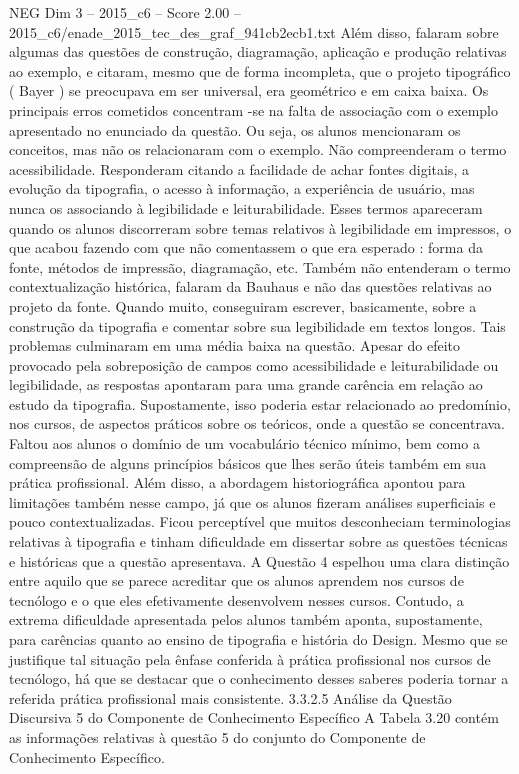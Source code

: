 \begin{textsample}{NEG Dim 3 – 2015\_c6 – Score 2.00 – 2015\_c6/enade\_2015\_tec\_des\_graf\_941cb2ecb1.txt}
Além disso, falaram sobre algumas das questões de construção, diagramação, aplicação e produção relativas ao exemplo, e citaram, mesmo que de forma incompleta, que o projeto tipográfico ( Bayer ) se preocupava em ser universal, era geométrico e em caixa baixa.
Os principais erros cometidos concentram -se na falta de associação com o exemplo apresentado no enunciado da questão.
Ou seja, os alunos mencionaram os conceitos, mas não os relacionaram com o exemplo.
Não compreenderam o termo acessibilidade.
Responderam citando a facilidade de achar fontes digitais, a evolução da tipografia, o acesso à informação, a experiência de usuário, mas nunca os associando à legibilidade e leiturabilidade.
Esses termos apareceram quando os alunos discorreram sobre temas relativos à legibilidade em impressos, o que acabou fazendo com que não comentassem o que era esperado : forma da fonte, métodos de impressão, diagramação, etc.
Também não entenderam o termo contextualização histórica, falaram da Bauhaus e não das questões relativas ao projeto da fonte.
Quando muito, conseguiram escrever, basicamente, sobre a construção da tipografia e comentar sobre sua legibilidade em textos longos.
Tais problemas culminaram em uma média baixa na questão.
Apesar do efeito provocado pela sobreposição de campos como acessibilidade e leiturabilidade ou legibilidade, as respostas apontaram para uma grande carência em relação ao estudo da tipografia.
Supostamente, isso poderia estar relacionado ao predomínio, nos cursos, de aspectos práticos sobre os teóricos, onde a questão se concentrava.
Faltou aos alunos o domínio de um vocabulário técnico mínimo, bem como a compreensão de alguns princípios básicos que lhes serão úteis também em sua prática profissional.
Além disso, a abordagem historiográfica apontou para limitações também nesse campo, já que os alunos fizeram análises superficiais e pouco contextualizadas.
Ficou perceptível que muitos desconheciam terminologias relativas à tipografia e tinham dificuldade em dissertar sobre as questões técnicas e históricas que a questão apresentava.
A Questão 4 espelhou uma clara distinção entre aquilo que se parece acreditar que os alunos aprendem nos cursos de tecnólogo e o que eles efetivamente desenvolvem nesses cursos.
Contudo, a extrema dificuldade apresentada pelos alunos também aponta, supostamente, para carências quanto ao ensino de tipografia e história do Design.
Mesmo que se justifique tal situação pela ênfase conferida à prática profissional nos cursos de tecnólogo, há que se destacar que o conhecimento desses saberes poderia tornar a referida prática profissional mais consistente. 3.3.2.5 Análise da Questão Discursiva 5 do Componente de Conhecimento Específico A Tabela 3.20 contém as informações relativas à questão 5 do conjunto do Componente de Conhecimento Específico.

\end{textsample}
